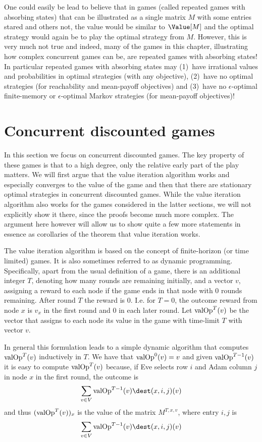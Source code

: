 One could easily be lead to believe that in games (called repeated games with absorbing states) that can be illustrated as a single matrix $M$ with some entries stared and others not, the value would be similar to $\Value[M]$ and the optimal strategy would again be to play the optimal strategy from $M$. 
However, this is very much not true and indeed, many of the games in this chapter, illustrating how complex concurrent games can be, are repeated games with absorbing states! In particular repeated games with absorbing states may (1)~have irrational values and probabilities in optimal strategies (with any objective), (2)~have no optimal strategies (for reachability and mean-payoff objectives) and (3)~have no $\epsilon$-optimal finite-memory or $\epsilon$-optimal Markov strategies (for mean-payoff objectives)!



\section{Concurrent discounted games}
In this section we focus on concurrent discounted games. 
The key property of these games is that to a high degree, only the relative early part of the play matters.
We will first argue that the value iteration algorithm works and especially converges to the value of the game and then that there are stationary optimal strategies in concurrent discounted games.
While the value iteration algorithm also works for the games considered in the latter sections, we will not explicitly show it there, since the proofs become much more complex. The argument here however will allow us to show quite a few more statements in essence as corollaries of the theorem that value iteration works.


The value iteration algorithm is based on the concept of finite-horizon (or time limited) games. It is also sometimes referred to as dynamic programming.
Specifically, apart from the usual definition of a game, there is an additional integer $T$, denoting how many rounds are remaining initially, and a vector $v$, assigning a reward to each node if the game ends in that node with 0 rounds remaining. After round $T$ the reward is 0. 
I.e. for $T=0$, the outcome reward from node $x$ is $v_x$ in the first round and 0 in each later round.
Let $\text{valOp}^T(v)$ be the vector that assigns to each node its value in the game with time-limit $T$ with vector $v$.

In general this formulation leads to a simple dynamic algorithm that computes $\text{valOp}^T(v)$ inductively in $T$. 
We have that $\text{valOp}^0(v)=v$ and given $\text{valOp}^{T-1}(v)$ it is easy to compute $\text{valOp}^T(v)$ because, if Eve selects row $i$ and Adam column $j$ in node $x$ in the first round, the outcome is \[
\sum_{v\in V}\ValueOp^{T-1}(v)\dest(x,i,j)(v)
\]
and thus $(\text{valOp}^T(v))_x$ is the value of the matrix $M^{T,x,v}$, where entry $i,j$ is \[
\sum_{v\in V}\ValueOp^{T-1}(v)\dest(x,i,j)(v)
\]

